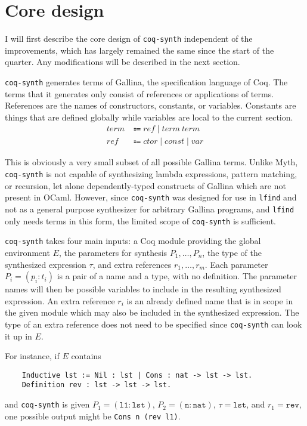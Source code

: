 \documentclass[11pt]{article}
\newcommand{\coq}[1]{\texttt{#1}}
\begin{document}
\section{Core design}

I will first describe the core design of \texttt{coq-synth} independent of the improvements, which has largely remained the same since the start of the quarter. Any modifications will be described in the next section.

\texttt{coq-synth} generates terms of Gallina, the specification language of Coq. The terms that it generates only consist of references or applications of terms. References are the names of constructors, constants, or variables. Constants are things that are defined globally while variables are local to the current section.
\begin{align*}
    \mathit{term} &\Coloneqq \mathit{ref} \mid \mathit{term}\ \mathit{term} \\
    \mathit{ref} &\Coloneqq \mathit{ctor} \mid \mathit{const} \mid \mathit{var}
\end{align*}

This is obviously a very small subset of all possible Gallina terms. Unlike Myth, \texttt{coq-synth} is not capable of synthesizing lambda expressions, pattern matching, or recursion, let alone dependently-typed constructs of Gallina which are not present in OCaml. However, since \texttt{coq-synth} was designed for use in \texttt{lfind} and not as a general purpose synthesizer for arbitrary Gallina programs, and \texttt{lfind} only needs terms in this form, the limited scope of \texttt{coq-synth} is sufficient.

\texttt{coq-synth} takes four main inputs: a Coq module providing the global environment $E$, the parameters for synthesis $P_1, \dots, P_n$, the type of the synthesized expression $\tau$, and extra references $r_1, \dots, r_m$. Each parameter $P_i = (p_i : t_i)$ is a pair of a name and a type, with no definition. The parameter names will then be possible variables to include in the resulting synthesized expression. An extra reference $r_i$ is an already defined name that is in scope in the given module which may also be included in the synthesized expression. The type of an extra reference does not need to be specified since \texttt{coq-synth} can look it up in $E$.

For instance, if $E$ contains
\begin{verbatim}
    Inductive lst := Nil : lst | Cons : nat -> lst -> lst.
    Definition rev : lst -> lst -> lst.
\end{verbatim}
and \texttt{coq-synth} is given $P_1 = (\coq{l1} : \coq{lst})$, $P_2 = (\coq{n} : \coq{nat})$, $\tau = \coq{lst}$, and $r_1 = \coq{rev}$, one possible output might be \coq{Cons n (rev l1)}.
\end{document}
